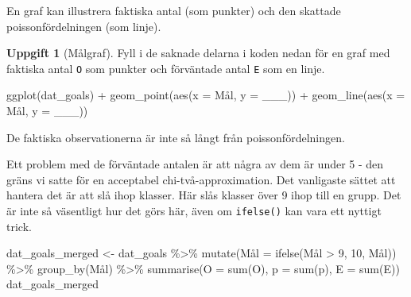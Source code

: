 \documentclass[
]{book}
\newenvironment{Shaded}{\begin{snugshade}}{\end{snugshade}}
\newcommand{\AttributeTok}[1]{\textcolor[rgb]{0.77,0.63,0.00}{#1}}
\newcommand{\DecValTok}[1]{\textcolor[rgb]{0.00,0.00,0.81}{#1}}
\newcommand{\FunctionTok}[1]{\textcolor[rgb]{0.00,0.00,0.00}{#1}}
\newcommand{\NormalTok}[1]{#1}
\newcommand{\OtherTok}[1]{\textcolor[rgb]{0.56,0.35,0.01}{#1}}
\newcommand{\SpecialCharTok}[1]{\textcolor[rgb]{0.00,0.00,0.00}{#1}}
\theoremstyle{definition}
\theoremstyle{definition}
\theoremstyle{definition}
\newtheorem{exercise}{Uppgift}[chapter]
\theoremstyle{definition}
\theoremstyle{remark}
\begin{document}
En graf kan illustrera faktiska antal (som punkter) och den skattade poissonfördelningen (som linje).

\begin{exercise}[Målgraf]

Fyll i de saknade delarna i koden nedan för en graf med faktiska antal \texttt{O} som punkter och förväntade antal \texttt{E} som en linje.

\begin{Shaded}
\begin{Highlighting}[]
\FunctionTok{ggplot}\NormalTok{(dat\_goals) }\SpecialCharTok{+}
  \FunctionTok{geom\_point}\NormalTok{(}\FunctionTok{aes}\NormalTok{(}\AttributeTok{x =}\NormalTok{ Mål, }\AttributeTok{y =}\NormalTok{ \_\_\_)) }\SpecialCharTok{+}
  \FunctionTok{geom\_line}\NormalTok{(}\FunctionTok{aes}\NormalTok{(}\AttributeTok{x =}\NormalTok{ Mål, }\AttributeTok{y =}\NormalTok{ \_\_\_))}
\end{Highlighting}
\end{Shaded}

\end{exercise}

De faktiska observationerna är inte så långt från poissonfördelningen.

Ett problem med de förväntade antalen är att några av dem är under 5 - den gräns vi satte för en acceptabel chi-två-approximation. Det vanligaste sättet att hantera det är att slå ihop klasser. Här slås klasser över 9 ihop till en grupp. Det är inte så väsentligt hur det görs här, även om \texttt{ifelse()} kan vara ett nyttigt trick.

\begin{Shaded}
\begin{Highlighting}[]
\NormalTok{dat\_goals\_merged }\OtherTok{\textless{}{-}}\NormalTok{ dat\_goals }\SpecialCharTok{\%\textgreater{}\%} 
  \FunctionTok{mutate}\NormalTok{(Mål }\OtherTok{=} \FunctionTok{ifelse}\NormalTok{(Mål }\SpecialCharTok{\textgreater{}} \DecValTok{9}\NormalTok{, }\DecValTok{10}\NormalTok{, Mål)) }\SpecialCharTok{\%\textgreater{}\%} 
  \FunctionTok{group\_by}\NormalTok{(Mål) }\SpecialCharTok{\%\textgreater{}\%} 
  \FunctionTok{summarise}\NormalTok{(}\AttributeTok{O =} \FunctionTok{sum}\NormalTok{(O),}
            \AttributeTok{p =} \FunctionTok{sum}\NormalTok{(p),}
            \AttributeTok{E =} \FunctionTok{sum}\NormalTok{(E))}
\NormalTok{dat\_goals\_merged}
\end{Highlighting}
\end{Shaded}
\end{document}
